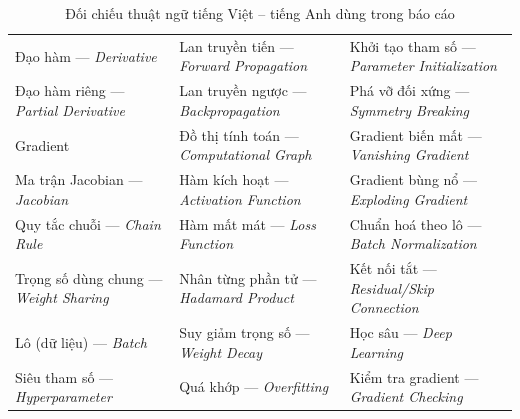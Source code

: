 \documentclass[12pt,a4paper]{article}
\newcommand{\en}[1]{\textit{#1}}
\begin{document}
\begin{table}[H]
\centering
\small
\begin{tabular}{@{}p{4.6cm}p{4.6cm}p{4.6cm}@{}}
\toprule
Đạo hàm --- \en{Derivative} & Lan truyền tiến --- \en{Forward Propagation} & Khởi tạo tham số --- \en{Parameter Initialization} \\
Đạo hàm riêng --- \en{Partial Derivative} & Lan truyền ngược --- \en{Backpropagation} & Phá vỡ đối xứng --- \en{Symmetry Breaking} \\
Gradient & Đồ thị tính toán --- \en{Computational Graph} & Gradient biến mất --- \en{Vanishing Gradient} \\
Ma trận Jacobian --- \en{Jacobian} & Hàm kích hoạt --- \en{Activation Function} & Gradient bùng nổ --- \en{Exploding Gradient} \\
Quy tắc chuỗi --- \en{Chain Rule} & Hàm mất mát --- \en{Loss Function} & Chuẩn hoá theo lô --- \en{Batch Normalization} \\
Trọng số dùng chung --- \en{Weight Sharing} & Nhân từng phần tử --- \en{Hadamard Product} & Kết nối tắt --- \en{Residual/Skip Connection} \\
Lô (dữ liệu) --- \en{Batch} & Suy giảm trọng số --- \en{Weight Decay} & Học sâu --- \en{Deep Learning} \\
Siêu tham số --- \en{Hyperparameter} & Quá khớp --- \en{Overfitting} & Kiểm tra gradient --- \en{Gradient Checking} \\
\bottomrule
\end{tabular}
\caption{Đối chiếu thuật ngữ tiếng Việt -- tiếng Anh dùng trong báo cáo}
\label{tab:glossary}
\end{table}
\end{document}
